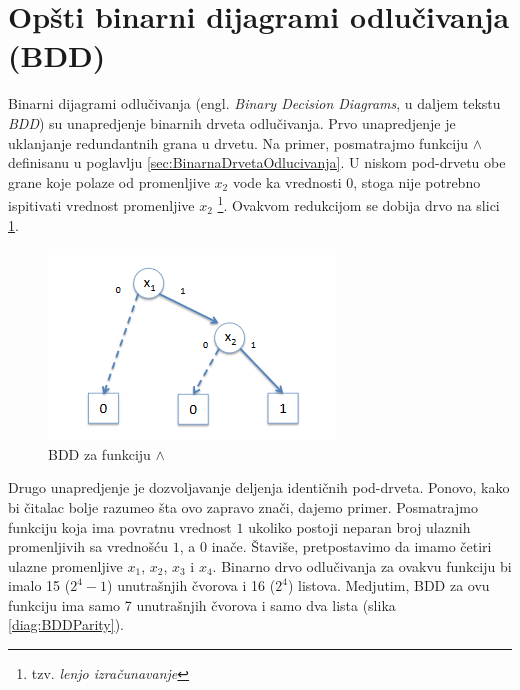 \section{Op\v{s}ti binarni dijagrami odlu\v{c}ivanja (BDD)}
\label{sec:BDD}

Binarni dijagrami odlu\v{c}ivanja (engl. \emph{Binary Decision Diagrams}, u daljem tekstu \emph{BDD}) su unapredjenje binarnih drveta odlu\v{c}ivanja. Prvo unapredjenje je uklanjanje redundantnih grana u drvetu. Na primer, posmatrajmo funkciju $\wedge$ definisanu u poglavlju \ref{sec:BinarnaDrvetaOdlucivanja}. U niskom pod-drvetu obe grane koje polaze od promenljive $x_{2}$ vode ka vrednosti $0$, stoga nije potrebno ispitivati vrednost promenljive $x_{2}$ \footnote{tzv. \emph{lenjo izra\v{c}unavanje}}. Ovakvom redukcijom se dobija drvo na slici \ref{diag:BDDAnd}.

\begin{figure}[H]
    \centering
    \includegraphics[scale=0.8]{slike/BDD_And.PNG}
    \caption{BDD za funkciju $\wedge$}
    \label{diag:BDDAnd}
\end{figure}

Drugo unapredjenje je dozvoljavanje deljenja identi\v{c}nih pod-drveta. Ponovo, kako bi \v{c}italac bolje razumeo \v{s}ta ovo zapravo zna\v{c}i, dajemo primer. Posmatrajmo funkciju koja ima povratnu vrednost $1$ ukoliko postoji neparan broj ulaznih promenljivih sa vredno\v{s}\'c{}u $1$, a $0$ ina\v{c}e. \v{S}tavi\v{s}e, pretpostavimo da imamo \v{c}etiri ulazne promenljive $x_{1}$, $x_{2}$, $x_{3}$ i $x_{4}$. Binarno drvo odlu\v{c}ivanja za ovakvu funkciju bi imalo 15 ($2^4 - 1$) unutra\v{s}njih \v{c}vorova i 16 ($2^4$) listova. Medjutim, BDD za ovu funkciju ima samo 7 unutra\v{s}njih \v{c}vorova i samo dva lista (slika \ref{diag:BDDParity}).

